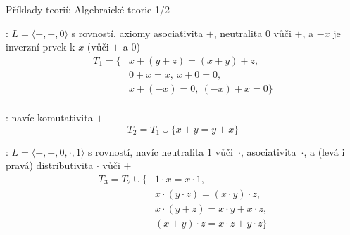 \documentclass{beamer}
\begin{document}
\begin{frame}{Příklady teorií: Algebraické teorie 1/2}

    \pause
    : $L=\langle +,-,0\rangle$ s rovností, axiomy 
    \alert{asociativita $+$}, \alert{neutralita $0$ vůči $+$}, a \alert{$-x$ je inverzní prvek k $x$ (vůči $+$ a $0$)}
    \pause
    {\small
    \begin{align*}
        T_1=\{& x + (y + z) = (x + y) + z,\\
            & 0 + x = x,\ x + 0 = 0,\\
            & x + (-x) = 0,\ (-x) + x = 0\}\\
    \end{align*}
    }
   
    \vspace{-24pt}

    \pause
    : navíc \alert{komutativita $+$} 
    \pause
    {\small
    $$
    T_2=T_1\cup\{x+y=y+x\}
    $$
    }

    \vspace{-6pt}

    \pause
    : $L=\langle +,-,0,\cdot,1\rangle$ s rovností, navíc \alert{neutralita $1$ vůči~$\cdot$}, \alert{asociativita~$\cdot$}, a \alert{(levá i pravá) distributivita $\cdot$ vůči $+$}
    \pause
    {\small
    \begin{align*}
        T_3=T_2\cup\{   & 1 \cdot x = x \cdot 1,\\
        & x \cdot (y \cdot z) = (x \cdot y) \cdot z,\\
        & x \cdot (y + z) = x \cdot y + x \cdot z,\\
        & (x + y) \cdot z = x \cdot z + y \cdot z\}
    \end{align*}
    }
\end{frame}
    
\end{document}
